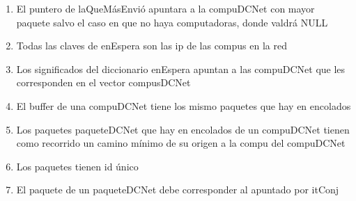 \begin{enumerate}
	\item El puntero de laQueMásEnvió apuntara a la compuDCNet con mayor
		paquete salvo el caso en que no haya computadoras, donde valdrá NULL
	\item Todas las claves de enEspera son las ip de las compus en la red
	\item Los significados del diccionario enEspera apuntan a las
		compuDCNet que les corresponden en el vector compusDCNet
	\item El buffer de una compuDCNet tiene los mismo paquetes que hay en
		encolados
	\item Los paquetes paqueteDCNet que hay en encolados de un compuDCNet tienen
		como recorrido un camino mínimo de su origen a la compu del compuDCNet
	\item Los paquetes tienen id único
	\item El paquete de un paqueteDCNet debe corresponder al apuntado por itConj
\end{enumerate}

